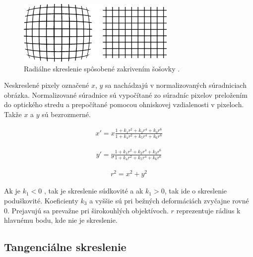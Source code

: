\begin{figure}[h]
	\centering
	\includegraphics[width=0.68\textwidth]{figures/radial_distortion.png} 
	\caption{Radiálne skreslenie spôsobené zakrivením šošovky \cite{bellavia2006underwater}.}
	\label{fig:radial_distortion}
\end{figure}

Neskreslené pixely označené $x$, $y$ sa nachádzajú v normalizovaných súradniciach obrázka. Normalizované súradnice sú vypočítané zo súradníc pixelov preložením do optického stredu a prepočítané pomocou ohniskovej vzdialenosti v pixeloch. Takže $x$ a $y$ sú bezrozmerné.

\begin{equation}
\label{eq::radial_dist::a}
\begin{aligned}
x'= x \frac{1 + k_{1}r^{2} + k_{2}r^{4} + k_{3}r^{6}}{1 + k_{4}r^{2} + k_{5}r^{4} + k_{6}r^{6}}
\end{aligned}
\end{equation}

\begin{equation}
\label{eq::radial_dist::b}
\begin{aligned}
y'= y \frac{1 + k_{1}r^{2} + k_{2}r^{4} + k_{3}r^{6}}{1 + k_{4}r^{2} + k_{5}r^{4} + k_{6}r^{6}}
\end{aligned}
\end{equation}

\begin{equation}
\label{eq::radial_dist::c}
\begin{aligned}
r^2=x^2+y^2
\end{aligned}
\end{equation}

Ak je $k_1<0$ , tak je skreslenie súdkovité a ak $k_1> 0$, tak ide o skreslenie poduškovité. Koeficienty $k_3$ a vyššie sú pri bežných deformáciách zvyčajne rovné 0. Prejavujú sa prevažne pri širokouhlých objektívoch. $r$ reprezentuje rádius k hlavnému bodu, kde nie je skreslenie.  

\subsection{Tangenciálne skreslenie}

